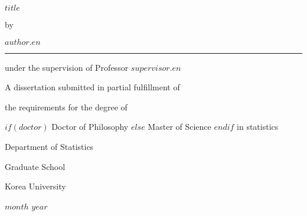 \documentclass[$fontsize$]{report}
\begin{document}
\newpage
\begin{center}
{\fontsize{21pt}{21pt} \selectfont $title$ \par}
\par\vfill
{\fontsize{16pt}{16pt}\selectfont by \par $author.en$ \par} %
\vspace{1.2cm}
\rule{.6\textwidth}{0.5pt} %
\par\vspace{0.7cm}
{\fontsize{16pt}{18pt}\selectfont
under the supervision of Professor $supervisor.en$ \par
\vspace{0.7cm}
A dissertation submitted in partial fulfillment of \par
the requirements for the degree of \par
$if(doctor)$
Doctor of Philosophy
$else$
Master of Science
$endif$ in statistics\par }
\vspace{1.0cm}
{\fontsize{16pt}{16pt}\selectfont Department of Statistics \par }  %
\vspace{1.5cm}
{\fontsize{18pt}{18pt}\selectfont Graduate School \par}
\vspace{0.5cm}
{\fontsize{18pt}{18pt}\selectfont Korea University \par}
\vspace{1cm}
{\fontsize{14pt}{14pt}\selectfont $month$ $year$} %
\end{center}

\end{document}
